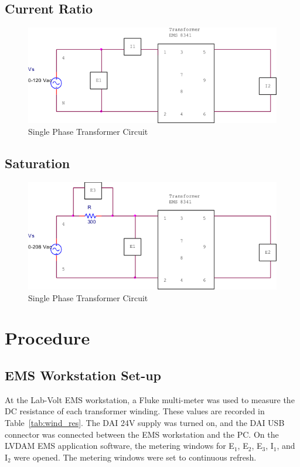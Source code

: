 \documentclass{article}
\begin{document}
\subsection{Current Ratio}
\begin{figure}[H]
  \centering
  \includegraphics[width=.8\textwidth]{img/circuit_02}
  \caption{Single Phase Transformer Circuit}
  \label{fig:circuit_02}
\end{figure}

\subsection{Saturation}
\begin{figure}[H]
  \centering
  \includegraphics[width=.8\textwidth]{img/circuit_03}
  \caption{Single Phase Transformer Circuit}
  \label{fig:circuit_03}
\end{figure}

\section{Procedure}
\subsection{EMS Workstation Set-up}

At the Lab-Volt EMS workstation, a Fluke multi-meter was used to measure the DC
resistance of each transformer winding. These values are recorded in
Table~\ref{tab:wind_res}.  The DAI 24V supply was turned on, and the DAI USB
connector was connected between the EMS workstation and the {PC}. On the LVDAM
EMS application software, the metering windows for E$_1$, E$_2$, E$_3$, I$_1$,
and I$_2$ were opened. The metering windows were set to continuous refresh.
\end{document}
